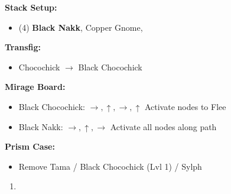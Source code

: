 \begin{menu}
	\textbf{Stack Setup:}
	\begin{itemize}
		\item (4) \textbf{Black Nakk}, Copper Gnome, \lann\
	\end{itemize}
	\textbf{Transfig:}
	\begin{itemize}
		\item Chocochick $\rightarrow$ Black Chocochick
	\end{itemize}
	\textbf{Mirage Board:}
	\begin{itemize}
		\item Black Chocochick: $\rightarrow,\uparrow,\rightarrow,\uparrow$ Activate nodes to Flee
		\item Black Nakk: $\rightarrow,\uparrow,\rightarrow$ Activate all nodes along path
	\end{itemize}
	\textbf{Prism Case:}
	\begin{itemize}
		\item Remove Tama / Black Chocochick (Lvl 1) / Sylph
	\end{itemize}
\end{menu}
\begin{enumerate}[resume]
	\item  {}
\end{enumerate}